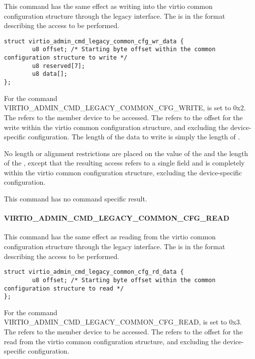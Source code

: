 This command has the same effect as writing into the virtio common configuration
structure through the legacy interface. The  is in
the format  describing
the access to be performed.

\begin{lstlisting}
struct virtio_admin_cmd_legacy_common_cfg_wr_data {
        u8 offset; /* Starting byte offset within the common configuration structure to write */
        u8 reserved[7];
        u8 data[];
};
\end{lstlisting}

For the command VIRTIO_ADMIN_CMD_LEGACY_COMMON_CFG_WRITE, 
is set to 0x2.
The  refers to the member device to be accessed.
The  refers to the offset for the write within the virtio common
configuration structure, and excluding the device-specific configuration.
The length of the data to write is simply the length of .

No length or alignment restrictions are placed on the value of the
 and the length of the , except that the resulting
access refers to a single field and is completely within the virtio common
configuration structure, excluding the device-specific configuration.

This command has no command specific result.

\paragraph{VIRTIO_ADMIN_CMD_LEGACY_COMMON_CFG_READ}
\label{par:Basic Facilities of a Virtio Device / Device groups / Group administration commands / Legacy Interface / VIRTIO_ADMIN_CMD_LEGACY_COMMON_CFG_READ}

This command has the same effect as reading from the virtio common configuration
structure through the legacy interface. The  is in
the format  describing
the access to be performed.

\begin{lstlisting}
struct virtio_admin_cmd_legacy_common_cfg_rd_data {
        u8 offset; /* Starting byte offset within the common configuration structure to read */
};
\end{lstlisting}

For the command VIRTIO_ADMIN_CMD_LEGACY_COMMON_CFG_READ, 
is set to 0x3.
The  refers to the member device to be accessed.
The  refers to the offset for the read from the virtio common
configuration structure, and excluding the device-specific configuration.

